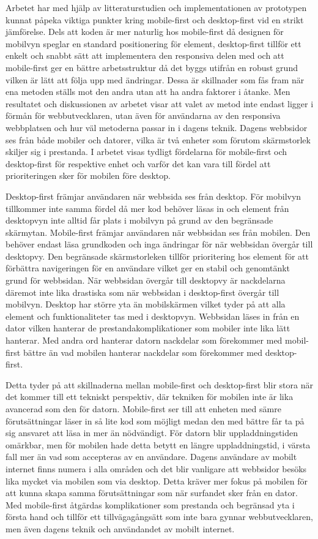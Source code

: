\documentclass[11pt]{article}
\begin{document}
Arbetet har med hjälp av litteraturstudien och implementationen av prototypen kunnat påpeka viktiga punkter kring mobile-first och desktop-first vid en strikt jämförelse. Dels att koden är mer naturlig hos mobile-first då designen för mobilvyn speglar en standard positionering för element, desktop-first tillför ett enkelt och snabbt sätt att implementera den responsiva delen med och att mobile-first ger en bättre arbetsstruktur då det byggs utifrån en robust grund vilken är lätt att följa upp med ändringar. Dessa är skillnader som fås fram när ena metoden ställs mot den andra utan att ha andra faktorer i åtanke. Men resultatet och diskussionen av arbetet visar att valet av metod inte endast ligger i förmån för webbutvecklaren, utan även för användarna av den responsiva webbplatsen och hur väl metoderna passar in i dagens teknik. Dagens webbsidor ses från både mobiler och datorer, vilka är två enheter som förutom skärmstorlek skiljer sig i prestanda. I arbetet visas tydligt fördelarna för mobile-first och desktop-first för respektive enhet och varför det kan vara till fördel att prioriteringen sker för mobilen före desktop.

Desktop-first främjar användaren när webbsida ses från desktop. För mobilvyn tillkommer inte samma fördel då mer kod behöver läsas in och element från desktopvyn inte alltid får plats i mobilvyn på grund av den begränsade skärmytan. Mobile-first främjar användaren när webbsidan ses från mobilen. Den behöver endast läsa grundkoden och inga ändringar för när webbsidan övergår till desktopvy. Den begränsade skärmstorleken tillför prioritering hos element för att förbättra navigeringen för en användare vilket ger en stabil och genomtänkt grund för webbsidan. När webbsidan övergår till desktopvy är nackdelarna däremot inte lika drastiska som när webbsidan i desktop-first övergår till mobilvyn. Desktop har större yta än mobilskärmen vilket tyder på att alla element och funktionaliteter tas med i desktopvyn. Webbsidan läses in från en dator vilken hanterar de prestandakomplikationer som mobiler inte lika lätt hanterar. Med andra ord hanterar datorn nackdelar som förekommer med mobil-first bättre än vad mobilen hanterar nackdelar som förekommer med desktop-first.

Detta tyder på att skillnaderna mellan mobile-first och desktop-first blir stora när det kommer till ett tekniskt perspektiv, där tekniken för mobilen inte är lika avancerad som den för datorn.  Mobile-first ser till att enheten med sämre förutsättningar läser in så lite kod som möjligt medan den med bättre får ta på sig ansvaret att läsa in mer än nödvändigt. För datorn blir uppladdningstiden omärkbar, men för mobilen hade detta betytt en längre uppladdningstid, i värsta fall mer än vad som accepteras av en användare. Dagens användare av mobilt internet finns numera i alla områden och det blir vanligare att webbsidor besöks lika mycket via mobilen som via desktop. Detta kräver mer fokus på mobilen för att kunna skapa samma förutsättningar som när surfandet sker från en dator. Med mobile-first åtgärdas komplikationer som prestanda och begränsad yta i första hand och tillför ett tillvägagångsätt som inte bara gynnar webbutvecklaren, men även dagens teknik och användandet av mobilt internet.




\printbibliography
\end{document}
